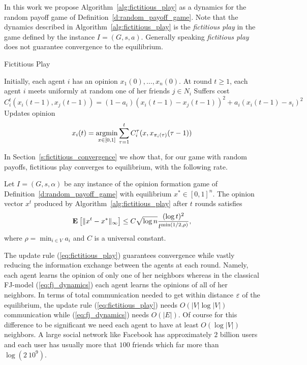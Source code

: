 In this work we propose Algorithm~\ref{alg:fictitious_play} as a dynamics
for the random payoff game of Definition~\ref{d:random_payoff_game}.
Note that the dynamics described in Algorithm~\ref{alg:fictitious_play} is the
\emph{fictitious play} in the game defined by the instance
$I=(G,s,a)$. Generally speaking \emph{fictitious play} does not guarantee
convergence to the equilibrium.
\begin{algorithm}
  \caption{Fictitious Play}
  \label{alg:fictitious_play}
  \begin{algorithmic}[1]
    \State Initially, each agent $i$ has an opinion $x_1(0),\ldots,x_n(0)$.
    \State At round $t \geq 1$, each agent $i$ meets uniformly at random one of
    her friends $j \in N_i$
    \State Suffers cost
    \(
      C^t_i(x_i(t-1),x_{j}(t-1))=(1-a_i)(x_i(t-1)
      -x_j(t-1))^2 + a_i(x_i(t-1)-s_i)^2
    \)
    \State Updates opinion
    \begin{equation}\label{eq:fictitious_play}
      x_i(t) =
      \operatorname*{argmin}_{x \in [0,1]}
      \sum_{\tau=1}^tC^{\tau}_i(x,x_{\pi_i(\tau)}(\tau-1))
    \end{equation}
\end{algorithmic}
\end{algorithm}
In Section~\ref{s:fictitious_convergence} we show that, for our game with
random payoffs, fictitious play converges to equilibrium, with the following
rate.
\begin{theorem}
  Let $I = (G,s, \alpha)$ be any instance of the opinion formation
  game of Definition~\ref{d:random_payoff_game} with equilibrium
  $x^* \in [0,1]^n$.  The opinion vector $x^t$ produced by
  Algorithm~\ref{alg:fictitious_play} after $t$ rounds satisfies
  \[
    \bm{\mathrm{E}}_{} \left[ \| x^t - x^* \|_{\infty} \right] \leq
    C \sqrt{\log n}\frac{(\log t)^{2}}{t^{\min(1/2,\rho)}},
  \]
  where $\rho = \min_{i \in V} a_i$ and $C$ is a universal constant.
\end{theorem}
The update rule (\ref{eq:fictitious_play}) guarantees convergence
while vastly reducing the information exchange between the agents
at each round.
Namely, each agent learns the opinion of only one of her neighbors
whereas in the classical FJ-model (\ref{eq:fj_dynamics}) each agent
learns the opinions of all of her neighbors. In terms of
total communication needed to get within distance $\varepsilon$ of the
equilibrium, the update rule (\ref{eq:fictitious_play}) needs
$O(|V| \log |V|)$ communication while (\ref{eq:fj_dynamics}) needs
$O(|E|)$. Of course for this difference to be significant we need
each agent to have at least $O(\log |V|)$ neighbors.  A large social
network like Facebook has approximately $2$ billion users and each user
has usually more that $100$ friends which far more than $\log(2\ 10^9)$.

